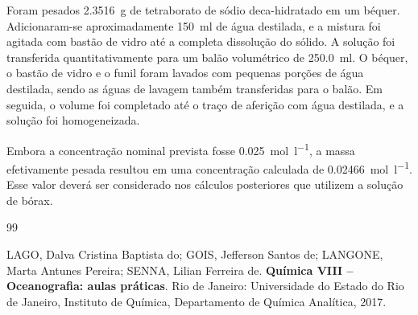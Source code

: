 \documentclass[a4paper,12pt]{article}
\begin{document}
Foram pesados \qty{2.3516}{\gram} de tetraborato de sódio deca-hidratado em um béquer. Adicionaram-se aproximadamente \qty{150}{\milli\litre} de água destilada, e a mistura foi agitada com bastão de vidro até a completa dissolução do sólido. A solução foi transferida quantitativamente para um balão volumétrico de \qty{250.0}{\milli\litre}. O béquer, o bastão de vidro e o funil foram lavados com pequenas porções de água destilada, sendo as águas de lavagem também transferidas para o balão. Em seguida, o volume foi completado até o traço de aferição com água destilada, e a solução foi homogeneizada.

\begin{tcolorbox}[
  title=Concentração da solução preparada,
  colback=quadrocinza,
  colframe=black!65,
  boxrule=0.6pt,
  arc=1mm
]
Embora a concentração nominal prevista fosse \qty{0.025}{\mole\per\litre}, a massa efetivamente pesada resultou em uma concentração calculada de \qty{0.02466}{\mole\per\litre}. Esse valor deverá ser considerado nos cálculos posteriores que utilizem a solução de bórax.
\end{tcolorbox}

%

\newpage
{}
{}
\begin{thebibliography}{99}

LAGO, Dalva Cristina Baptista do;
GOIS, Jefferson Santos de;
LANGONE, Marta Antunes Pereira;
SENNA, Lilian Ferreira de.
\textbf{Química VIII -- Oceanografia: aulas práticas}.
Rio de Janeiro: Universidade do Estado do Rio de Janeiro, Instituto de Química, Departamento de Química Analítica, 2017.

\end{thebibliography}
\end{document}
